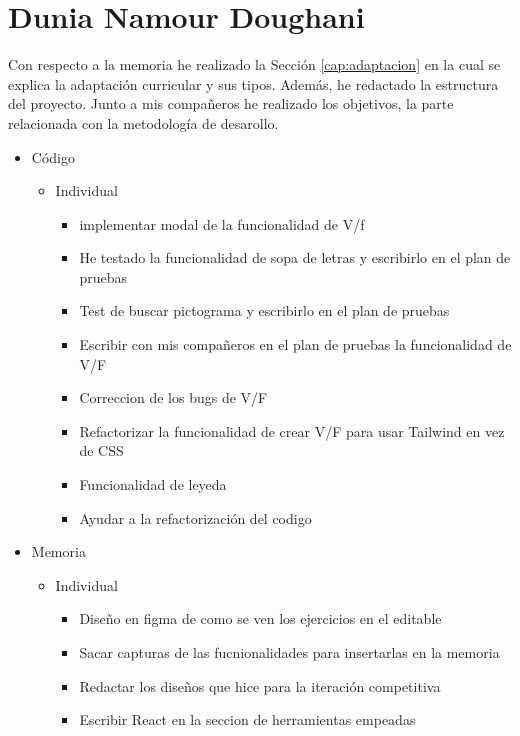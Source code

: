 \section{Dunia Namour Doughani}
Con respecto a la memoria he realizado la Sección \ref{cap:adaptacion} en la cual se explica la adaptación curricular y sus tipos. Además, he redactado la estructura del proyecto. Junto a mis compañeros he realizado los objetivos, la parte relacionada con la metodología de desarollo.
\begin{itemize}
    \item Código
        \begin{itemize}
            \item Individual
                \begin{itemize}
                    \item implementar modal de la funcionalidad de V/f
                    \item He testado la funcionalidad de sopa de letras y escribirlo en el plan de pruebas 
                    \item Test de buscar pictograma y escribirlo en el plan de pruebas 
                    \item Escribir con mis compañeros en el plan de pruebas la funcionalidad de V/F
                    \item Correccion de los bugs de V/F
                    \item Refactorizar la funcionalidad de crear V/F para usar Tailwind en vez de CSS
                    \item Funcionalidad de leyeda
                    \item Ayudar a la refactorización del codigo
                \end{itemize}
        \end{itemize}
        \item Memoria
    \begin{itemize}
        \item Individual
            \begin{itemize}
                \item Diseño en figma de como se ven los ejercicios en el editable 
                \item Sacar capturas de las fucnionalidades para insertarlas en la memoria 
                \item Redactar los diseños que hice para la iteración competitiva
                \item Escribir React en la seccion de herramientas empeadas
                

\end{itemize}
\end{itemize}
\end{itemize}
